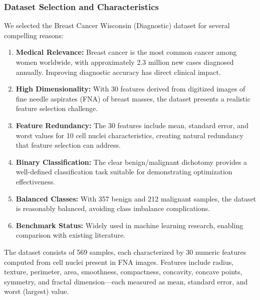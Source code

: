 \documentclass[12pt, a4paper]{article}
\begin{document}
\subsubsection{Dataset Selection and Characteristics}
We selected the Breast Cancer Wisconsin (Diagnostic) dataset for several compelling reasons:
\begin{enumerate}
    \item \textbf{Medical Relevance:} Breast cancer is the most common cancer among women worldwide, with approximately 2.3 million new cases diagnosed annually. Improving diagnostic accuracy has direct clinical impact.
    \item \textbf{High Dimensionality:} With 30 features derived from digitized images of fine needle aspirates (FNA) of breast masses, the dataset presents a realistic feature selection challenge.
    \item \textbf{Feature Redundancy:} The 30 features include mean, standard error, and worst values for 10 cell nuclei characteristics, creating natural redundancy that feature selection can address.
    \item \textbf{Binary Classification:} The clear benign/malignant dichotomy provides a well-defined classification task suitable for demonstrating optimization effectiveness.
    \item \textbf{Balanced Classes:} With 357 benign and 212 malignant samples, the dataset is reasonably balanced, avoiding class imbalance complications.
    \item \textbf{Benchmark Status:} Widely used in machine learning research, enabling comparison with existing literature.
\end{enumerate}

The dataset consists of 569 samples, each characterized by 30 numeric features computed from cell nuclei present in FNA images. Features include radius, texture, perimeter, area, smoothness, compactness, concavity, concave points, symmetry, and fractal dimension—each measured as mean, standard error, and worst (largest) value.
\end{document}

